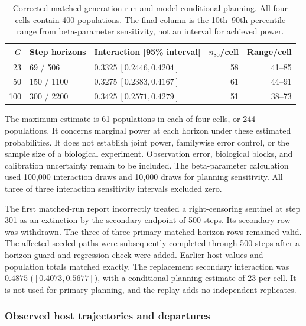 \begin{table}[htbp]
\centering
\caption{Corrected matched-generation run and model-conditional planning.
All four cells contain 400 populations. The final column is the 10th--90th
percentile range from beta-parameter sensitivity, not an interval for achieved power.}
\label{num-planning}
\begin{tabular}{rllrr}
\toprule
$G$ & Step horizons & Interaction [95\% interval] & $n_{80}$/cell & Range/cell \\
\midrule
23 & 69 / 506 & $0.3325\ [0.2446,0.4204]$ & 58 & 41--85 \\
50 & 150 / 1100 & $0.3275\ [0.2383,0.4167]$ & 61 & 44--91 \\
100 & 300 / 2200 & $0.3425\ [0.2571,0.4279]$ & 51 & 38--73 \\
\bottomrule
\end{tabular}
\end{table}

The maximum estimate is 61 populations in each of four cells, or 244
populations. It concerns marginal power at each horizon under these
estimated probabilities. It does not establish joint power, familywise
error control, or the sample size of a biological experiment. Observation
error, biological blocks, and calibration uncertainty remain to be included.
The beta-parameter calculation used 100,000 interaction draws and 10,000
draws for planning sensitivity. All three of three interaction sensitivity
intervals excluded zero.

The first matched-run report incorrectly treated a right-censoring sentinel
at step 301 as an extinction by the secondary endpoint of 500 steps.
Its secondary row was withdrawn. The three of three primary matched-horizon
rows remained valid. The affected seeded paths were subsequently completed
through 500 steps after a horizon guard and regression check were added.
Earlier host values and population totals matched exactly. The replacement
secondary interaction was $0.4875$ ($[0.4073,0.5677]$), with a conditional
planning estimate of 23 per cell. It is not used for primary planning,
and the replay adds no independent replicates.

\subsubsection{Observed host trajectories and departures}
\label{num-esm-host-series}

